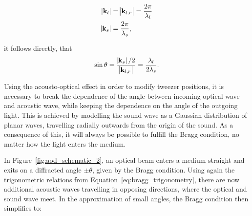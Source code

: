 \begin{align}
	\abs{\mathbf{k}_l} &= \abs{\mathbf{k}_{l,r}} = \frac{2\pi}{\lambda_l} \\
	\abs{\mathbf{k}_s} &= \frac{2\pi}{\lambda_s},
\end{align}

it follows directly, that
\begin{align}
	\label{eq:bragg_trigonometry}
	\sin{\theta} = \frac{\abs{\mathbf{k}_s} / 2}{\abs{\mathbf{k}_{l,r}}} = \frac{\lambda_l}{2\lambda_s}.
\end{align}

\begin{figure}[t]
\end{figure}



Using the acousto-optical effect in order to modify tweezer positions, it is necessary to break the dependence of the angle between incoming optical wave and acoustic wave, while keeping the dependence on the angle of the outgoing light. This is achieved by modelling the sound wave as a Gaussian distribution of planar waves, travelling radially outwards from the origin of the sound. As a consequence of this, it will always be possible to fulfill the Bragg condition, no matter how the light enters the medium.

In Figure~\ref{fig:aod_schematic_2}, an optical beam enters a medium straight and exits on a diffracted angle $\pm \theta$, given by the Bragg condition. Using again the trigonometric relations from Equation~\ref{eq:bragg_trigonometry}, there are now additional acoustic waves travelling in opposing directions, where the optical and sound wave meet. In the approximation of small angles, the Bragg condition then simplifies to:

